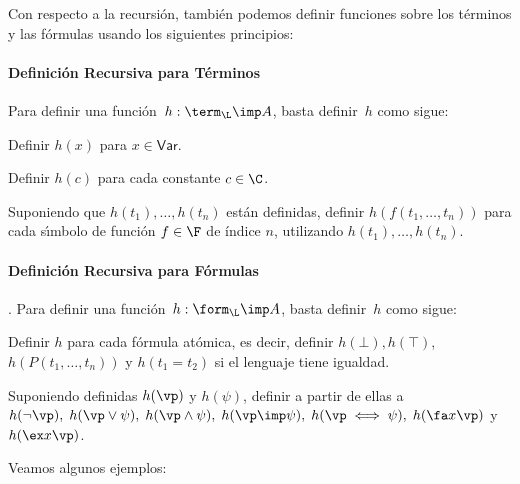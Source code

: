 \documentclass[11pt,letterpaper]{article}
\begin{document}
Con respecto a la recursión, tambi\'en podemos definir funciones sobre los 
términos y las fórmulas usando los siguientes principios:

\paragraph{Definici\'on Recursiva para T\'erminos} 
Para definir una funci\'on~$h:\term_\L\imp A$, basta definir~$h$ como sigue:
\bi
\item Definir $h(x)$ para $x\in\mathsf{Var}$.
\item Definir $h(c)$ para cada constante $c\in\C$.
\item Suponiendo que $h(t_1),\ldots,h(t_n)$ est\'an definidas, definir
$h(f(t_1,\ldots,\allowbreak t_n))$ para cada s\'{\i}mbolo de funci\'on $f\in\F$ 
de índice $n$, utilizando $h(t_1),\ldots,\allowbreak h(t_n)$.
\ei


\paragraph{Definici\'on Recursiva para F\'ormulas}.
Para definir una funci\'on~$h:\form_\L\imp A$, basta definir~$h$ como sigue:
\bi
\item Definir $h$ para cada f\'ormula at\'omica, es decir, definir $h(\bot), 
h(\top)$, $h(P(t_1,\ldots,t_n))$ y $h(t_1=t_2)$ si el lenguaje tiene igualdad.
\item Suponiendo definidas $h(\vp)$ y $h(\psi)$, definir a partir de
ellas a\\
$h(\neg\vp),\;h(\vp\lor\psi),\;h(\vp\land\psi),\;h(\vp\imp\psi),
\;h(\vp\iff\psi) 
,\;h(\fa x\vp)$ y $h(\ex x\vp)$. 
\ei

\espc

\noindent Veamos algunos ejemplos:
\end{document}
